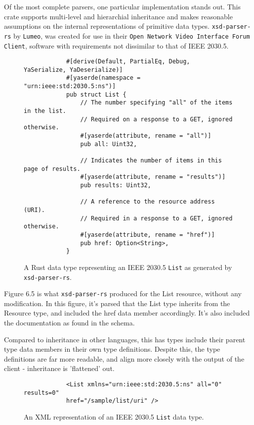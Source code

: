 Of the most complete parsers, one particular implementation stands out. This crate supports multi-level and hierarchial inheritance and makes reasonable assumptions on the internal representations of primitive data types.
\texttt{xsd-parser-rs} by \texttt{Lumeo}, was created for use in their \texttt{Open Network Video Interface Forum Client}, software with requirements not dissimilar to that of IEEE 2030.5. \cite[]{xsdparserrs}

\begin{figure}[H]
    \begin{center}
        \begin{lstlisting}
            #[derive(Default, PartialEq, Debug, YaSerialize, YaDeserialize)]
            #[yaserde(namespace = "urn:ieee:std:2030.5:ns")]
            pub struct List {
                // The number specifying "all" of the items in the list. 
                // Required on a response to a GET, ignored otherwise.
                #[yaserde(attribute, rename = "all")]
                pub all: Uint32,
            
                // Indicates the number of items in this page of results.
                #[yaserde(attribute, rename = "results")]
                pub results: Uint32,
            
                // A reference to the resource address (URI). 
                // Required in a response to a GET, ignored otherwise.
                #[yaserde(attribute, rename = "href")]
                pub href: Option<String>,
            }
        \end{lstlisting}
        \label{fig:listauto}
        \caption{A Rust data type representing an IEEE 2030.5 \texttt{List} as generated by \texttt{xsd-parser-rs}.}
    \end{center}
\end{figure}

Figure 6.5 is what \texttt{xsd-parser-rs} produced for the List resource, without any modification. In this figure, it's parsed that the List type inherits from the Resource type, and included the href data member accordingly. It's also included the documentation as found in the schema.

Compared to inheritance in other languages, this has types include their parent type data members in their own type definitions.
Despite this, the type definitions are far more readable, and align more closely with the output of the client - inheritance is 'flattened' out.


\begin{figure}[H]
    \begin{center}
        \begin{lstlisting}
            <List xmlns="urn:ieee:std:2030.5:ns" all="0" results=0" 
            href="/sample/list/uri" />
        \end{lstlisting}
        \label{fig:listxml}
        \caption{An XML representation of an IEEE 2030.5 \texttt{List} data type.}
    \end{center}
\end{figure}


